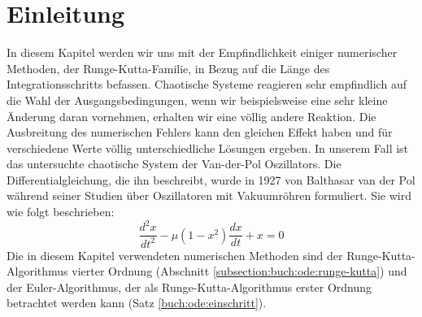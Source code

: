 %
%
%
\section{Einleitung\label{vanderpol:section:einleitung}}
In diesem Kapitel werden wir uns mit der Empfindlichkeit einiger numerischer Methoden, der Runge-Kutta-Familie, in Bezug auf die Länge des Integrationsschritts befassen.
Chaotische Systeme reagieren sehr empfindlich auf die Wahl der Ausgangsbedingungen, wenn wir beispielsweise eine sehr kleine Änderung daran vornehmen, erhalten wir eine völlig andere Reaktion.
Die Ausbreitung des numerischen Fehlers kann den gleichen Effekt haben und für verschiedene Werte völlig unterschiedliche Lösungen ergeben.
In unserem Fall ist das untersuchte chaotische System der Van-der-Pol Oszillators.
Die Differentialgleichung, die ihn beschreibt, wurde in 1927 von Balthasar van der Pol während seiner Studien über Oszillatoren mit Vakuumröhren formuliert.
Sie wird wie folgt beschrieben:
\begin{equation}
\frac{d^{2}x}{dt^{2}} - \mu (1 - x^{2}) \frac{dx}{dt} + x = 0
\label{vanderpol:equations:vdp}
\end{equation}
Die in diesem Kapitel verwendeten numerischen Methoden sind der Runge-Kutta-Algorithmus vierter Ordnung (Abschnitt \ref{subsection:buch:ode:runge-kutta}) und der Euler-Algorithmus, der als Runge-Kutta-Algorithmus erster Ordnung betrachtet werden kann (Satz \ref{buch:ode:einschritt}).

